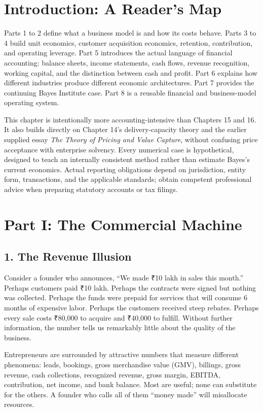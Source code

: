 \section*{Introduction: A Reader's Map}

Parts 1 to 2 define what a business model is and how its costs behave. Parts 3 to 4 build unit economics, customer acquisition economics, retention, contribution, and operating leverage. Part 5 introduces the actual language of financial accounting: balance sheets, income statements, cash flows, revenue recognition, working capital, and the distinction between cash and profit. Part 6 explains how different industries produce different economic architectures. Part 7 provides the continuing Bayes Institute case. Part 8 is a reusable financial and business-model operating system.

This chapter is intentionally more accounting-intensive than Chapters 15 and 16. It also builds directly on Chapter 14's delivery-capacity theory and the earlier supplied essay \emph{The Theory of Pricing and Value Capture}, without confusing price acceptance with enterprise solvency. Every numerical case is hypothetical, designed to teach an internally consistent method rather than estimate Bayes's current economics. Actual reporting obligations depend on jurisdiction, entity form, transactions, and the applicable standards; obtain competent professional advice when preparing statutory accounts or tax filings.

\section*{Part I: The Commercial Machine}

\subsection*{1. The Revenue Illusion}

Consider a founder who announces, ``We made ₹10 lakh in sales this month.'' Perhaps customers paid ₹10 lakh. Perhaps the contracts were signed but nothing was collected. Perhaps the funds were prepaid for services that will consume 6 months of expensive labor. Perhaps the customers received steep rebates. Perhaps every sale costs ₹80,000 to acquire and ₹40,000 to fulfill. Without further information, the number tells us remarkably little about the quality of the business.

Entrepreneurs are surrounded by attractive numbers that measure different phenomena: leads, bookings, gross merchandise value (GMV), billings, gross revenue, cash collections, recognized revenue, gross margin, EBITDA, contribution, net income, and bank balance. Most are useful; none can substitute for the others. A founder who calls all of them ``money made'' will misallocate resources.

